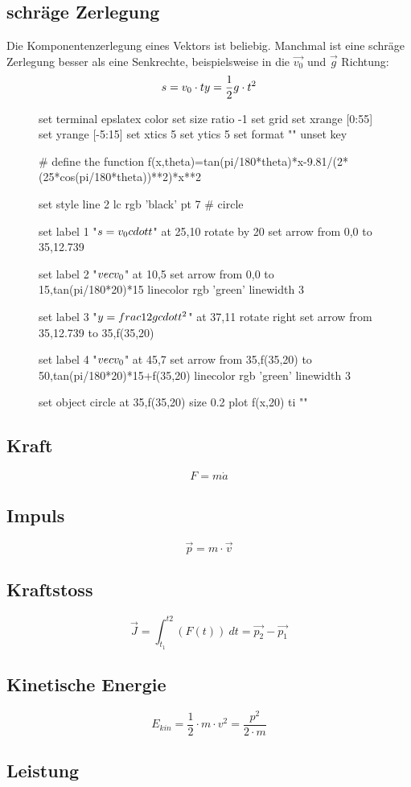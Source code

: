 \subsection{schräge Zerlegung}
Die Komponentenzerlegung eines Vektors ist beliebig. Manchmal ist eine schräge Zerlegung besser als eine Senkrechte,
beispielsweise in die $\vec{v_0}$ und $\vec{g}$ Richtung:
\newline
\[
	s=v_0 \cdot t \\
	y=\frac{1}{2}g \cdot t^2
\]
\begin{figure}[htbp]
\centering
\begin{gnuplot}[scale=0.75]
	set terminal epslatex color
	set size ratio -1
	set grid
  set xrange [0:55]
	set yrange [-5:15]
	set xtics 5
	set ytics 5
	set format ""
	unset key

  # define the function
  f(x,theta)=tan(pi/180*theta)*x-9.81/(2*(25*cos(pi/180*theta))**2)*x**2

	set style line 2 lc rgb 'black' pt 7   # circle
	
	set label 1 "$s=v_0 \\cdot t$" at 25,10 rotate by 20
	set arrow from 0,0 to 35,12.739
	
	set label 2 "$\\vec{v_0}$" at 10,5
	set arrow from 0,0 to 15,tan(pi/180*20)*15 linecolor rgb 'green' linewidth 3
	
	set label 3 "$y=\\frac{1}{2}g \\cdot t^2$" at 37,11 rotate right
	set arrow from 35,12.739 to 35,f(35,20)
	
	set label 4 "$\\vec{v_0}$" at 45,7
	set arrow from 35,f(35,20) to 50,tan(pi/180*20)*15+f(35,20) linecolor rgb 'green' linewidth 3
	
	set object circle at 35,f(35,20) size 0.2
  plot f(x,20) ti ""
	\end{gnuplot}
\end{figure}

\subsection{Kraft}
\[ F = m \dot a \]

\subsection{Impuls}
\[ \vec{p} = m \cdot \vec{v} \]

\subsection{Kraftstoss}
\[ \vec{J} = \int_{t_1}^{t2} (F(t)) ~ dt = \vec{p_2} - \vec{p_1} \]

\subsection{Kinetische Energie}
\[ E_{kin} = \frac{1}{2} \cdot m \cdot v^2 = \frac{p^2}{2 \cdot m} \]

\subsection{Leistung}
\[  \]

